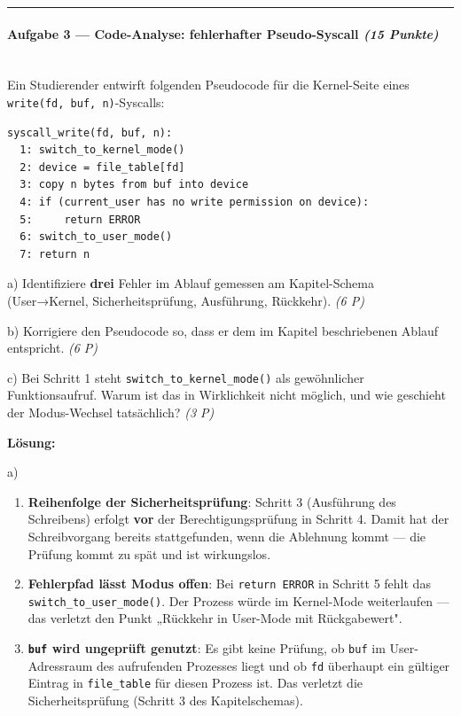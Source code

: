 \documentclass[11pt, a4paper]{article}
\begin{document}
\noindent\textcolor{rulegray}{\rule{\linewidth}{0.4pt}}


\paragraph{Aufgabe 3 — Code-Analyse: fehlerhafter Pseudo-Syscall \textit{(15 Punkte)}}\mbox{}\\[2pt]

Ein Studierender entwirft folgenden Pseudocode für die Kernel-Seite eines \texttt{write(fd, buf, n)}-Syscalls:


\begin{lstlisting}
syscall_write(fd, buf, n):
  1: switch_to_kernel_mode()
  2: device = file_table[fd]
  3: copy n bytes from buf into device
  4: if (current_user has no write permission on device):
  5:     return ERROR
  6: switch_to_user_mode()
  7: return n
\end{lstlisting}


a) Identifiziere \textbf{drei} Fehler im Ablauf gemessen am Kapitel-Schema (User→Kernel, Sicherheitsprüfung, Ausführung, Rückkehr). \textit{(6 P)}


b) Korrigiere den Pseudocode so, dass er dem im Kapitel beschriebenen Ablauf entspricht. \textit{(6 P)}


c) Bei Schritt 1 steht \texttt{switch\_to\_kernel\_mode()} als gewöhnlicher Funktionsaufruf. Warum ist das in Wirklichkeit nicht möglich, und wie geschieht der Modus-Wechsel tatsächlich? \textit{(3 P)}


\textbf{Lösung:}


a)

\begin{enumerate}
  \item \textbf{Reihenfolge der Sicherheitsprüfung}: Schritt 3 (Ausführung des Schreibens) erfolgt \textbf{vor} der Berechtigungsprüfung in Schritt 4. Damit hat der Schreibvorgang bereits stattgefunden, wenn die Ablehnung kommt — die Prüfung kommt zu spät und ist wirkungslos.
  \item \textbf{Fehlerpfad lässt Modus offen}: Bei \texttt{return ERROR} in Schritt 5 fehlt das \texttt{switch\_to\_user\_mode()}. Der Prozess würde im Kernel-Mode weiterlaufen — das verletzt den Punkt „Rückkehr in User-Mode mit Rückgabewert".
  \item \textbf{\texttt{buf} wird ungeprüft genutzt}: Es gibt keine Prüfung, ob \texttt{buf} im User-Adressraum des aufrufenden Prozesses liegt und ob \texttt{fd} überhaupt ein gültiger Eintrag in \texttt{file\_table} für diesen Prozess ist. Das verletzt die Sicherheitsprüfung (Schritt 3 des Kapitelschemas).
\end{enumerate}
\end{document}
